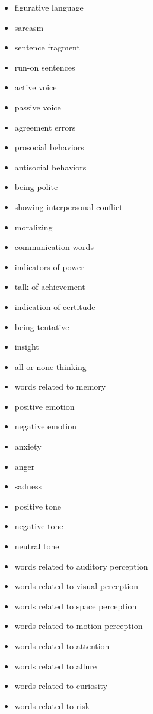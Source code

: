 \begin{multicols}{2}
  \begin{itemize}[nolistsep]
    \item figurative language
    \item sarcasm
    \item sentence fragment
    \item run-on sentences
    \item active voice
    \item passive voice
    \item agreement errors
    \item prosocial behaviors
    \item antisocial behaviors
    \item being polite
    \item showing interpersonal conflict
    \item moralizing
    \item communication words
    \item indicators of power
    \item talk of achievement
    \item indication of certitude
    \item being tentative
    \item insight
    \item all or none thinking
    \item words related to memory
    \item positive emotion
    \item negative emotion
    \item anxiety
    \item anger
    \item sadness
    \item positive tone
    \item negative tone
    \item neutral tone
    \item words related to auditory perception
    \item words related to visual perception
    \item words related to space perception
    \item words related to motion perception
    \item words related to attention
    \item words related to allure
    \item words related to curiosity
    \item words related to risk

\end{itemize}
\end{multicols}
